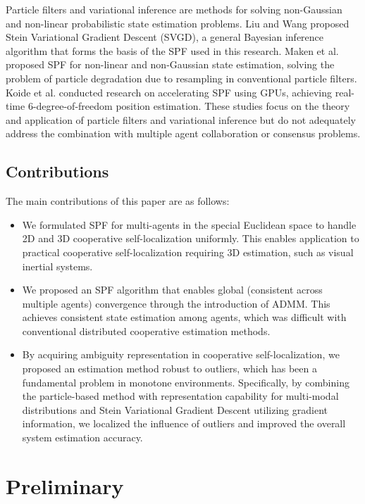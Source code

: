 \documentclass[a4paper,fleqn,10pt,twocolumn]{SICE_ISCS}
\begin{document}
Particle filters and variational inference are methods for solving non-Gaussian and non-linear probabilistic state estimation problems. Liu and Wang \cite{Liu2016} proposed Stein Variational Gradient Descent (SVGD), a general Bayesian inference algorithm that forms the basis of the SPF used in this research. Maken et al. \cite{Maken2021} proposed SPF for non-linear and non-Gaussian state estimation, solving the problem of particle degradation due to resampling in conventional particle filters. Koide et al. \cite{Koide2021} conducted research on accelerating SPF using GPUs, achieving real-time 6-degree-of-freedom position estimation. These studies focus on the theory and application of particle filters and variational inference but do not adequately address the combination with multiple agent collaboration or consensus problems.

\subsection{Contributions}

The main contributions of this paper are as follows:
\begin{itemize}
\item We formulated SPF for multi-agents in the special Euclidean space to handle 2D and 3D cooperative self-localization uniformly. This enables application to practical cooperative self-localization requiring 3D estimation, such as visual inertial systems.
\item We proposed an SPF algorithm that enables global (consistent across multiple agents) convergence through the introduction of ADMM. This achieves consistent state estimation among agents, which was difficult with conventional distributed cooperative estimation methods.
\item By acquiring ambiguity representation in cooperative self-localization, we proposed an estimation method robust to outliers, which has been a fundamental problem in monotone environments. Specifically, by combining the particle-based method with representation capability for multi-modal distributions and Stein Variational Gradient Descent utilizing gradient information, we localized the influence of outliers and improved the overall system estimation accuracy.
\end{itemize}

\section{Preliminary}
\end{document}
